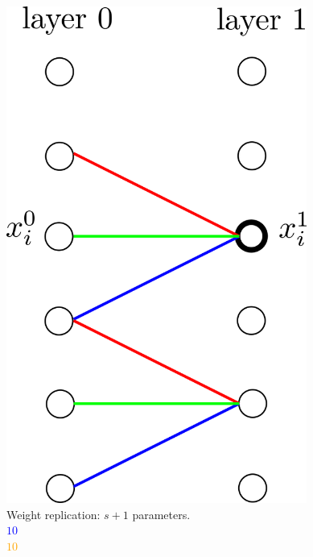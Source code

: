 \documentclass[xcolor=pdftex,dvipsnames,table,mathserif]{beamer}
\begin{document}
{\begin{columns}
    \begin{column}{0.3\textwidth}
      \begin{center}
        \includegraphics[width=0.74\textwidth]{convolutional_layer.png}
        \\ \scriptsize{Weight replication: $s+1$ parameters.}
        \\ \textcolor{blue}{\scriptsize{$10$}}
        \\ \textcolor{orange}{\scriptsize{$10$}}

      \end{center}
    \end{column}

  \end{columns}



}
\end{document}
